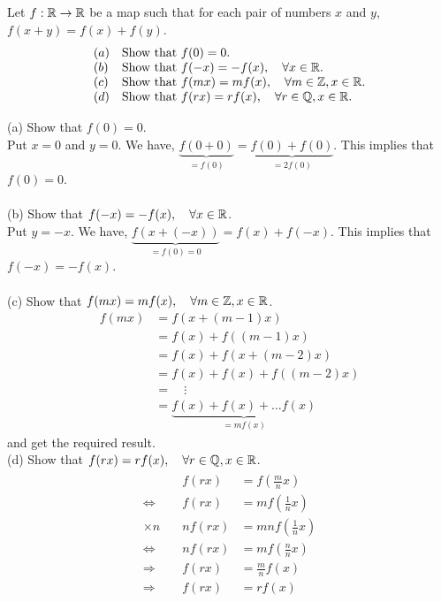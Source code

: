 \subsection{}
\begin{tcolorbox}
Let $f:\mathbb{R}\rightarrow \mathbb{R}$ be a map such that for each pair of numbers $x$ and $y$, $f(x+y)=f(x)+f(y)$. 
\begin{align*}
\begin{array}{ll}
(a)&\text{Show that  }f(0)=0.\\
(b)&\text{Show that  }f(-x)=-f(x),\quad\forall x\in \mathbb{R}.\\
(c)&\text{Show that  }f(mx)=mf(x),\quad \forall m \in \mathbb{Z}, x\in \mathbb{R}.\\
(d)&\text{Show that  }f(rx)=rf(x),\quad \forall r \in \mathbb{Q}, x\in \mathbb{R}.\\
\end{array}
\end{align*} 
\end{tcolorbox}
$$ $$ 
(a) Show that $f(0)=0$.\\
Put $x=0$ and $y=0$. We have, $\underbrace{f(0+0)}_{=f(0)} =\underbrace{f(0)+f(0)}_{=2f(0)}$. This implies that $f(0)=0$.\\\\
(b) Show that $f(-x)=-f(x),\quad\forall x\in \mathbb{R}$.\\
Put  $y=-x$. We have, $\underbrace{f(x+(-x))}_{=f(0)=0} =f(x)+f(-x)$. This implies that $f(-x)=-f(x)$.\\\\
(c) Show that $f(mx)=mf(x),\quad \forall m \in \mathbb{Z}, x\in \mathbb{R}$.
\begin{align*}
f(mx)&= f(x+ (m-1)x)\\
&= f(x)+ f((m-1)x)\\
&= f(x)+ f(x+(m-2)x)\\
&= f(x)+ f(x)+f((m-2)x)\\
&=\quad \vdots\\
&= \underbrace{f(x)+ f(x)+\dots f(x)}_{=mf(x)}
\end{align*}
and get the required result.\\
(d) Show that $f(rx)=rf(x),\quad \forall r \in \mathbb{Q}, x\in \mathbb{R}$.
\begin{align*}\begin{matrix}
&f(rx)&= f(\frac{m}{n}x)\\
\Leftrightarrow& f(rx)&= mf(\frac{1}{n}x)\\
\times n\quad & nf(rx)&= mnf(\frac{1}{n}x)\\
\Leftrightarrow&nf(rx) &= mf(\frac{n}{n}x)\\
\Rightarrow & f(rx) &= \frac{m}{n}f(x)\\
\Rightarrow & f(rx) &= rf(x)
\end{matrix}
\end{align*}
 
